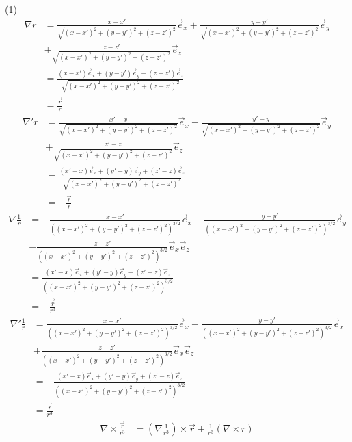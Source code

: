 \documentclass{phyasgn}
\begin{document}
\begin{sol}[2]
    (1)\begin{align*}
        \nabla r&=\frac{x-x'}{\sqrt{(x-x')^2+(y-y')^2+(z-z')^2}}\vec{e}_x+\frac{y-y'}{\sqrt{(x-x')^2+(y-y')^2+(z-z')^2}}\vec{e}_y\\
        &+\frac{z-z'}{\sqrt{(x-x')^2+(y-y')^2+(z-z')^2}}\vec{e}_z\\
        &=\frac{(x-x')\vec{e}_x+(y-y')\vec{e}_y+(z-z')\vec{e}_z}{\sqrt{(x-x')^2+(y-y')^2+(z-z')^2}}\\
        &=\frac{\vec{r}}{r}
    \end{align*}
    \begin{align*}
        \nabla' r&=\frac{x'-x}{\sqrt{(x-x')^2+(y-y')^2+(z-z')^2}}\vec{e}_x+\frac{y'-y}{\sqrt{(x-x')^2+(y-y')^2+(z-z')^2}}\vec{e}_y\\
        &+\frac{z'-z}{\sqrt{(x-x')^2+(y-y')^2+(z-z')^2}}\vec{e}_z\\
        &=\frac{(x'-x)\vec{e}_x+(y'-y)\vec{e}_y+(z'-z)\vec{e}_z}{\sqrt{(x-x')^2+(y-y')^2+(z-z')^2}}\\
        &=-\frac{\vec{r}}{r}
    \end{align*}
    \begin{align*}
        \nabla \frac{1}{r}&=-\frac{x-x'}{\left((x-x')^2+(y-y')^2+(z-z')^2\right)^{3/2}}\vec{e}_x-\frac{y-y'}{\left((x-x')^2+(y-y')^2+(z-z')^2\right)^{3/2}}\vec{e}_y\\
        &-\frac{z-z'}{\left((x-x')^2+(y-y')^2+(z-z')^2\right)^{3/2}}\vec{e}_x\vec{e}_z\\
        &=\frac{(x'-x)\vec{e}_x+(y'-y)\vec{e}_y+(z'-z)\vec{e}_z}{\left((x-x')^2+(y-y')^2+(z-z')^2\right)^{3/2}}\\
        &=-\frac{\vec{r}}{r^3}
    \end{align*}
    \begin{align*}
        \nabla '\frac{1}{r}&=\frac{x-x'}{\left((x-x')^2+(y-y')^2+(z-z')^2\right)^{3/2}}\vec{e}_x+\frac{y-y'}{\left((x-x')^2+(y-y')^2+(z-z')^2\right)^{3/2}}\vec{e}_x\\
        &+\frac{z-z'}{\left((x-x')^2+(y-y')^2+(z-z')^2\right)^{3/2}}\vec{e}_x\vec{e}_z\\
        &=-\frac{(x'-x)\vec{e}_x+(y'-y)\vec{e}_y+(z'-z)\vec{e}_z}{\left((x-x')^2+(y-y')^2+(z-z')^2\right)^{3/2}}\\
        &=\frac{\vec{r}}{r^3}
    \end{align*}
    \begin{align*}
        \nabla \times\frac{\vec{r}}{r^3}&=(\nabla \frac{1}{r^3})\times \vec{r}+\frac{1}{r^3}(\nabla\times r)\\

\end{align*}
\end{sol}
\end{document}
